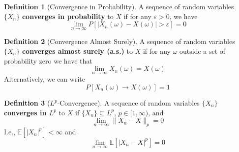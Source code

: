 \documentclass[12pt,a4paper]{article}
\theoremstyle{definition}
\newtheorem{definition}{Definition}[section]
\begin{document}
\begin{definition}[Convergence in Probability]
	A sequence of random variables $\{ X_n \}$ \textbf{converges in probability} to $X$ if for any $\varepsilon > 0$, we have
	\[
		\lim_{n \to \infty} P[|X_n(\omega) - X(\omega)| > \varepsilon] = 0
	\]
\end{definition}

\begin{definition}[Convergence Almost Surely]
	A sequence of random variables $\{ X_n \}$ \textbf{converges almost surely (a.s.)} to $X$ if for any $\omega$ outside a set of probability zero we have that
	\[
		\lim_{n \to \infty} X_n(\omega) = X(\omega)
	\]
	Alternatively, we can write
	\[
		P[X_n(\omega) \to X(\omega)] = 1
	\]
\end{definition}

\begin{definition}[$L^p$-Convergence]
	A sequence of random variables $\{ X_n \}$ \textbf{converges in $L^p$} to $X$ if $\{X_n\} \subseteq L^p$, $p \in [1,\infty)$, and
	\[
		\lim_{n \to \infty} \|X_n - X\|_p = 0
	\]
	I.e., $\mathbb{E} \left[ |X_n|^p \right] < \infty$ and
	\[
		\lim_{n \to \infty} \mathbb{E} \left[ |X_n - X|^p \right] = 0
	\]
\end{definition}

\newpage
\nocite{*}


\end{document}
